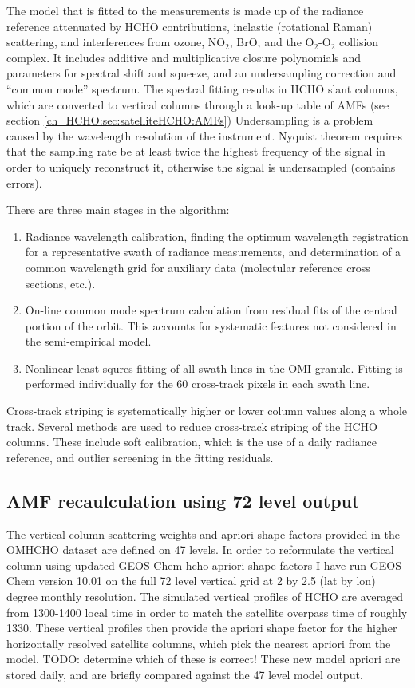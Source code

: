     The model that is fitted to the measurements is made up of the radiance reference attenuated by HCHO contributions, inelastic (rotational Raman) scattering, and interferences from ozone, NO$_2$, BrO, and the O$_2$-O$_2$ collision complex.
    It includes additive and multiplicative closure polynomials and parameters for spectral shift and squeeze, and an undersampling correction and ``common mode'' spectrum.
    The spectral fitting results in HCHO slant columns, which are converted to vertical columns through a look-up table of AMFs (see section \ref{ch_HCHO:sec:satelliteHCHO:AMFs})
    Undersampling is a problem caused by the wavelength resolution of the instrument.
    Nyquist theorem requires that the sampling rate be at least twice the highest frequency of the signal in order to uniquely reconstruct it, otherwise the signal is undersampled (contains errors).
    
    There are three main stages in the algorithm:
    \begin{enumerate}
      \item Radiance wavelength calibration, finding the optimum wavelength registration for a representative swath of radiance measurements, and determination of a common wavelength grid for auxiliary data (molectular reference cross sections, etc.).
      \item On-line common mode spectrum calculation from residual fits of the central portion of the orbit. 
      This accounts for systematic features not considered in the semi-empirical model.
      \item Nonlinear least-squres fitting of all swath lines in the OMI granule. 
      Fitting is performed individually for the 60 cross-track pixels in each swath line.
    \end{enumerate}
    
    Cross-track striping is systematically higher or lower column values along a whole track.
    Several methods are used to reduce cross-track striping of the HCHO columns.
    These include soft calibration, which is the use of a daily radiance reference, and outlier screening in the fitting residuals.
    
  \subsection{AMF recaulculation using 72 level output}
    The vertical column scattering weights and apriori shape factors provided in the OMHCHO dataset are defined on 47 levels.
    In order to reformulate the vertical column using updated GEOS-Chem hcho apriori shape factors I have run GEOS-Chem version 10.01 on the full 72 level vertical grid at 2 by 2.5 (lat by lon) degree monthly resolution. 
    The simulated vertical profiles of HCHO are averaged from 1300-1400 local time in order to match the satellite overpass time of roughly 1330.
    These vertical profiles then provide the apriori shape factor for the higher horizontally resolved satellite columns, which pick the nearest apriori from the model.
    TODO: determine which of these is correct!
    These new model apriori are stored daily, and are briefly compared against the 47 level model output.
    
